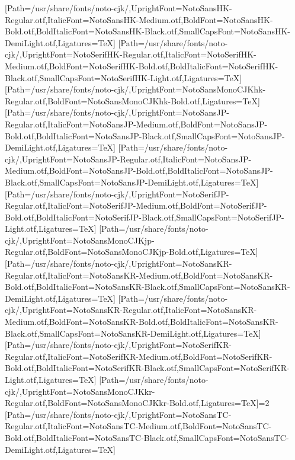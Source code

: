 \newfontfamily{}[Path=/usr/share/fonts/noto-cjk/,UprightFont=NotoSansHK-Regular.otf,ItalicFont=NotoSansHK-Medium.otf,BoldFont=NotoSansHK-Bold.otf,BoldItalicFont=NotoSansHK-Black.otf,SmallCapsFont=NotoSansHK-DemiLight.otf,Ligatures=TeX]
\newfontfamily{}[Path=/usr/share/fonts/noto-cjk/,UprightFont=NotoSerifHK-Regular.otf,ItalicFont=NotoSerifHK-Medium.otf,BoldFont=NotoSerifHK-Bold.otf,BoldItalicFont=NotoSerifHK-Black.otf,SmallCapsFont=NotoSerifHK-Light.otf,Ligatures=TeX]
\newfontfamily{}[Path=/usr/share/fonts/noto-cjk/,UprightFont=NotoSansMonoCJKhk-Regular.otf,BoldFont=NotoSansMonoCJKhk-Bold.otf,Ligatures=TeX]
\newfontfamily{}[Path=/usr/share/fonts/noto-cjk/,UprightFont=NotoSansJP-Regular.otf,ItalicFont=NotoSansJP-Medium.otf,BoldFont=NotoSansJP-Bold.otf,BoldItalicFont=NotoSansJP-Black.otf,SmallCapsFont=NotoSansJP-DemiLight.otf,Ligatures=TeX]
\newfontfamily{}[Path=/usr/share/fonts/noto-cjk/,UprightFont=NotoSansJP-Regular.otf,ItalicFont=NotoSansJP-Medium.otf,BoldFont=NotoSansJP-Bold.otf,BoldItalicFont=NotoSansJP-Black.otf,SmallCapsFont=NotoSansJP-DemiLight.otf,Ligatures=TeX]
\newfontfamily{}[Path=/usr/share/fonts/noto-cjk/,UprightFont=NotoSerifJP-Regular.otf,ItalicFont=NotoSerifJP-Medium.otf,BoldFont=NotoSerifJP-Bold.otf,BoldItalicFont=NotoSerifJP-Black.otf,SmallCapsFont=NotoSerifJP-Light.otf,Ligatures=TeX]
\newfontfamily{}[Path=/usr/share/fonts/noto-cjk/,UprightFont=NotoSansMonoCJKjp-Regular.otf,BoldFont=NotoSansMonoCJKjp-Bold.otf,Ligatures=TeX]
\newfontfamily{}[Path=/usr/share/fonts/noto-cjk/,UprightFont=NotoSansKR-Regular.otf,ItalicFont=NotoSansKR-Medium.otf,BoldFont=NotoSansKR-Bold.otf,BoldItalicFont=NotoSansKR-Black.otf,SmallCapsFont=NotoSansKR-DemiLight.otf,Ligatures=TeX]
\newfontfamily{}[Path=/usr/share/fonts/noto-cjk/,UprightFont=NotoSansKR-Regular.otf,ItalicFont=NotoSansKR-Medium.otf,BoldFont=NotoSansKR-Bold.otf,BoldItalicFont=NotoSansKR-Black.otf,SmallCapsFont=NotoSansKR-DemiLight.otf,Ligatures=TeX]
\newfontfamily{}[Path=/usr/share/fonts/noto-cjk/,UprightFont=NotoSerifKR-Regular.otf,ItalicFont=NotoSerifKR-Medium.otf,BoldFont=NotoSerifKR-Bold.otf,BoldItalicFont=NotoSerifKR-Black.otf,SmallCapsFont=NotoSerifKR-Light.otf,Ligatures=TeX]
\newfontfamily{}[Path=/usr/share/fonts/noto-cjk/,UprightFont=NotoSansMonoCJKkr-Regular.otf,BoldFont=NotoSansMonoCJKkr-Bold.otf,Ligatures=TeX]\else\ifnum\value{NotoCJKFamily}=2
\newfontfamily{}[Path=/usr/share/fonts/noto-cjk/,UprightFont=NotoSansTC-Regular.otf,ItalicFont=NotoSansTC-Medium.otf,BoldFont=NotoSansTC-Bold.otf,BoldItalicFont=NotoSansTC-Black.otf,SmallCapsFont=NotoSansTC-DemiLight.otf,Ligatures=TeX]
